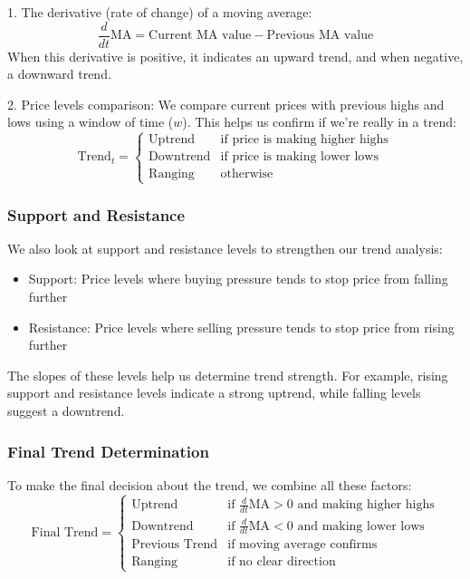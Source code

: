 \documentclass[12pt]{article}
\begin{document}
1. The derivative (rate of change) of a moving average:
\begin{equation*}
    \frac{d}{dt}\text{MA} = \text{Current MA value} - \text{Previous MA value}
\end{equation*}
When this derivative is positive, it indicates an upward trend, and when negative, a downward trend.

2. Price levels comparison:
We compare current prices with previous highs and lows using a window of time ($w$). This helps us confirm if we're really in a trend:
\begin{equation*}
\text{Trend}_t = \begin{cases}
    \text{Uptrend} & \text{if price is making higher highs} \\
    \text{Downtrend} & \text{if price is making lower lows} \\
    \text{Ranging} & \text{otherwise}
\end{cases}
\end{equation*}

\subsubsection*{Support and Resistance}
We also look at support and resistance levels to strengthen our trend analysis:

\begin{itemize}
    \item Support: Price levels where buying pressure tends to stop price from falling further
    \item Resistance: Price levels where selling pressure tends to stop price from rising further
\end{itemize}

The slopes of these levels help us determine trend strength. For example, rising support and resistance levels indicate a strong uptrend, while falling levels suggest a downtrend.

\subsubsection*{Final Trend Determination}
To make the final decision about the trend, we combine all these factors:
\begin{equation*}
\text{Final Trend} = \begin{cases}
    \text{Uptrend} & \text{if } \frac{d}{dt}\text{MA} > 0 \text{ and making higher highs} \\
    \text{Downtrend} & \text{if } \frac{d}{dt}\text{MA} < 0 \text{ and making lower lows} \\
    \text{Previous Trend} & \text{if moving average confirms} \\
    \text{Ranging} & \text{if no clear direction}
\end{cases}
\end{equation*}
\end{document}
